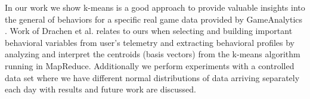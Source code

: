 In our work we show k-means is a good approach to provide valuable insights into the general of behaviors for a specific real game data provided by GameAnalytics \citep{GA2013}. Work of Drachen et al. \citep{Drachen:2012, Drachen:2013} relates to ours when selecting and building important behavioral variables from user's telemetry and extracting behavioral profiles by analyzing and interpret the centroids (basis vectors) from the k-means algorithm running in MapReduce. Additionally we perform experiments with a controlled data set where we have different normal distributions of data arriving separately each day with results and future work are discussed.